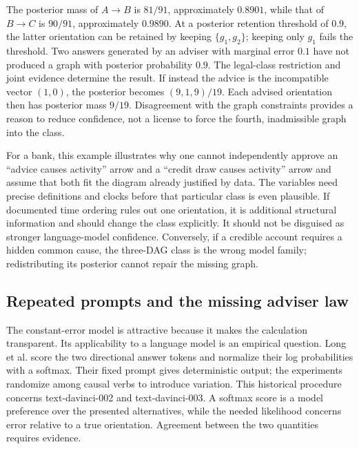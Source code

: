 The posterior mass of $A\to B$ is $81/91$, approximately $0.8901$, while that
of $B\to C$ is $90/91$, approximately $0.9890$. At a posterior retention
threshold of $0.9$, the latter orientation can be retained by keeping
$\{g_1,g_2\}$; keeping only $g_1$ fails the threshold. Two answers generated by
an adviser with marginal error $0.1$ have not produced a graph with posterior
probability $0.9$. The legal-class restriction and joint evidence determine
the result. If instead the advice is the incompatible vector $(1,0)$, the
posterior becomes $(9,1,9)/19$. Each advised orientation then has posterior
mass $9/19$. Disagreement with the graph constraints provides a reason to
reduce confidence, not a license to force the fourth, inadmissible graph into
the class.

For a bank, this example illustrates why one cannot independently approve an
``advice causes activity'' arrow and a ``credit draw causes activity'' arrow
and assume that both fit the diagram already justified by data. The variables
need precise definitions and clocks before that particular class is even
plausible. If documented time ordering rules out one orientation, it is
additional structural information and should change the class explicitly.
It should not be disguised as stronger language-model confidence. Conversely,
if a credible account requires a hidden common cause, the three-DAG class is
the wrong model family; redistributing its posterior cannot repair the missing
graph.

\subsection{Repeated prompts and the missing adviser law}

The constant-error model is attractive because it makes the calculation
transparent. Its applicability to a language model is an empirical question.
Long et al. score the two directional answer tokens and normalize their log
probabilities with a softmax. Their fixed prompt gives deterministic output;
the experiments randomize among causal verbs to introduce variation. This
historical procedure concerns text-davinci-002 and text-davinci-003. A softmax
score is a model preference over the presented alternatives, while the needed
likelihood concerns error relative to a true orientation. Agreement between
the two quantities requires evidence.~\citep{exec17_imperfect_experts}

